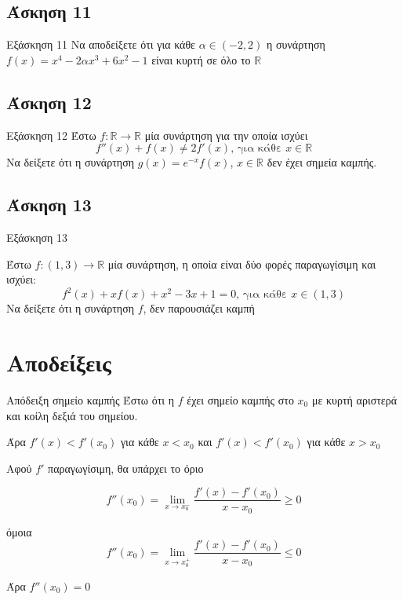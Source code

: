 \documentclass[greek]{beamer}
\begin{document}
\subsection{Άσκηση 11}
\begin{frame}[label=Άσκηση11,,t]{Εξάσκηση 11}
 Να αποδείξετε ότι για κάθε $α\in (-2,2)$ η συνάρτηση $f(x)=x^4-2αx^3+6x^2-1$ είναι κυρτή σε όλο το $\mathbb{R}$

\end{frame}

\subsection{Άσκηση 12}
\begin{frame}[label=Άσκηση12,t]{Εξάσκηση 12}
 Έστω $f:\mathbb{R}\to\mathbb{R}$ μία συνάρτηση για την οποία ισχύει
 $$f''(x)+f(x)\ne 2f'(x)\text{, για κάθε } x\in\mathbb{R}$$
 Να δείξετε ότι η συνάρτηση $g(x)=e^{-x}f(x)$, $x\in\mathbb{R}$ δεν έχει σημεία καμπής.

\end{frame}

\subsection{Άσκηση 13}
\begin{frame}[label=Άσκηση13,t]{Εξάσκηση 13}

 Έστω $f:(1,3)\to\mathbb{R}$ μία συνάρτηση, η οποία είναι δύο φορές παραγωγίσιμη και ισχύει:
 $$f^2(x)+xf(x)+x^2-3x+1=0\text{, για κάθε } x\in (1,3)$$
 Να δείξετε ότι η συνάρτηση $f$, δεν παρουσιάζει καμπή

\end{frame}


\appendix

\section{Αποδείξεις}
\begin{frame}[label=Απόδειξη1]{Απόδειξη σημείο καμπής}
  Έστω ότι η $f$ έχει σημείο καμπής στο $x_0$ με κυρτή αριστερά και κοίλη δεξιά του σημείου.

 Άρα $f'(x)< f'(x_0)$ για κάθε $x<x_0$ και $f'(x)<f'(x_0)$ για κάθε $x>x_0$

  Αφού $f'$ παραγωγίσιμη, θα υπάρχει το όριο

 $$f''(x_0)=\lim\limits_{x \to x_0^-}{ \dfrac{f'(x)-f'(x_0)}{x-x_0} }\ge 0$$

  όμοια
 $$f''(x_0)=\lim\limits_{x \to x_0^+}{ \dfrac{f'(x)-f'(x_0)}{x-x_0} } \le 0$$

  Άρα $f''(x_0)=0$ \hyperlink{Θεώρημα1}{}
\end{frame}
\end{document}
